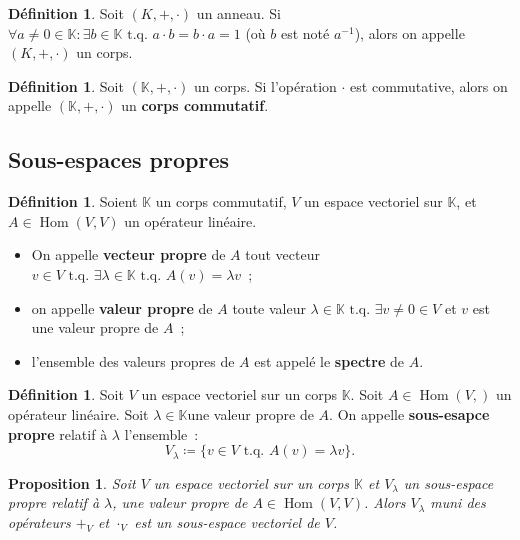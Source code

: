 \documentclass{article}
\DeclareMathOperator{\Hom}{Hom}
\newcommand{\K}{\mathbb K}
\newcommand{\tq}{\textrm{ t.q. }}
\newtheorem{prp}[thm]{Proposition}
\theoremstyle{definition}
\newtheorem{déf}[thm]{Définition}
\theoremstyle{remark}
\begin{document}
		\begin{déf} Soit $(K, +, \cdot)$ un anneau. Si $\forall a \neq 0 \in \K : \exists b \in \K \tq a \cdot b = b \cdot a = 1$ (où $b$ est noté $a^{-1}$), alors
		on appelle $(K, +, \cdot)$ un corps. \end{déf}

		\begin{déf} Soit $(\K, +, \cdot)$ un corps. Si l'opération $\cdot$ est commutative, alors on appelle $(\K, +, \cdot)$ un \textbf{corps commutatif}. \end{déf}

	\subsection{Sous-espaces propres}
		\begin{déf} Soient $\K$ un corps commutatif, $V$ un espace vectoriel sur $\K$, et $A \in \Hom(V, V)$ un opérateur linéaire.

		\begin{itemize}
			\item On appelle \textbf{vecteur propre} de $A$ tout vecteur $v \in V \tq \exists \lambda \in \K \tq A(v) = \lambda v$~;
			\item on appelle \textbf{valeur propre } de $A$ toute valeur $\lambda \in \K \tq \exists v \neq 0 \in V$ et $v$ est une valeur propre de $A$~;
			\item l'ensemble des valeurs propres de $A$ est appelé le \textbf{spectre} de $A$.
		\end{itemize}
		\end{déf}

		\begin{déf} Soit $V$ un espace vectoriel sur un corps $\K$. Soit $A \in \Hom(V, )$ un opérateur linéaire. Soit $\lambda \in \K$une valeur propre de $A$.
		On appelle \textbf{sous-esapce propre} relatif à $\lambda$ l'ensemble~: \[V_\lambda \coloneqq \{v \in V \tq A(v) = \lambda v\}.\] \end{déf}

		\begin{prp} Soit $V$ un espace vectoriel sur un corps $\K$ et $V_\lambda$ un sous-espace propre relatif à $\lambda$, une valeur propre de $A \in \Hom(V, V)$.
		Alors $V_\lambda$ muni des opérateurs $+_V$ et $\cdot_V$ est un sous-espace vectoriel de $V$. \end{prp}
\end{document}
